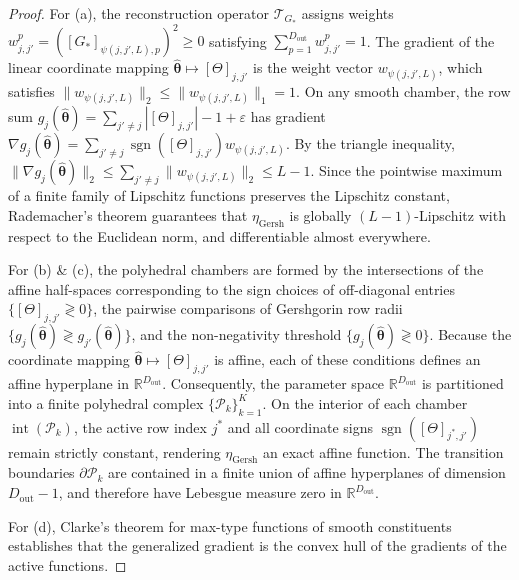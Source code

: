 \documentclass[default,sn-mathphys,Numbered]{sn-jnl}
\theoremstyle{thmstyleone}
\theoremstyle{thmstylethree}
\theoremstyle{thmstyletwo}
\newcommand{\outp}{\text{out}}
\begin{document}
\begin{appendices}
\begin{proof}
For (a), the reconstruction operator $\mathcal{T}_{G_*}$ assigns weights $w_{j, j'}^p = ([G_*]_{\psi(j, j', L), p})^2 \ge 0$ satisfying $\sum_{p=1}^{D_{\outp}} w_{j, j'}^p = 1$. The gradient of the linear coordinate mapping $\hat{\bm{\theta}} \mapsto [\Theta]_{j, j'}$ is the weight vector $w_{\psi(j, j', L)}$, which satisfies $\|w_{\psi(j, j', L)}\|_2 \le \|w_{\psi(j, j', L)}\|_1 = 1$. On any smooth chamber, the row sum $g_j(\hat{\bm{\theta}}) = \sum_{j' \neq j} |[\Theta]_{j, j'}| - 1 + \varepsilon$ has gradient $\nabla g_j(\hat{\bm{\theta}}) = \sum_{j' \neq j} \operatorname{sgn}([\Theta]_{j, j'}) w_{\psi(j, j', L)}$. By the triangle inequality, $\|\nabla g_j(\hat{\bm{\theta}})\|_2 \le \sum_{j' \neq j} \|w_{\psi(j, j', L)}\|_2 \le L - 1$. Since the pointwise maximum of a finite family of Lipschitz functions preserves the Lipschitz constant, Rademacher's theorem guarantees that $\eta_{\mathrm{Gersh}}$ is globally $(L-1)$-Lipschitz with respect to the Euclidean norm, and differentiable almost everywhere.

For (b) \& (c), the polyhedral chambers are formed by the intersections of the affine half-spaces corresponding to the sign choices of off-diagonal entries $\{[\Theta]_{j, j'} \gtrless 0\}$, the pairwise comparisons of Gershgorin row radii $\{g_j(\hat{\bm{\theta}}) \gtrless g_{j'}(\hat{\bm{\theta}})\}$, and the non-negativity threshold $\{g_j(\hat{\bm{\theta}}) \gtrless 0\}$. Because the coordinate mapping $\hat{\bm{\theta}} \mapsto [\Theta]_{j, j'}$ is affine, each of these conditions defines an affine hyperplane in $\mathbb{R}^{D_{\outp}}$. Consequently, the parameter space $\mathbb{R}^{D_{\outp}}$ is partitioned into a finite polyhedral complex $\{\mathcal{P}_k\}_{k=1}^K$. On the interior of each chamber $\operatorname{int}(\mathcal{P}_k)$, the active row index $j^*$ and all coordinate signs $\operatorname{sgn}([\Theta]_{j^*, j'})$ remain strictly constant, rendering $\eta_{\mathrm{Gersh}}$ an exact affine function. The transition boundaries $\partial \mathcal{P}_k$ are contained in a finite union of affine hyperplanes of dimension $D_{\outp} - 1$, and therefore have Lebesgue measure zero in $\mathbb{R}^{D_{\outp}}$.

For (d), Clarke's theorem for max-type functions of smooth constituents \citep[Theorem~2.3.9]{clarke1990optimization} establishes that the generalized gradient is the convex hull of the gradients of the active functions.
\end{proof}


\end{appendices}
\end{document}
